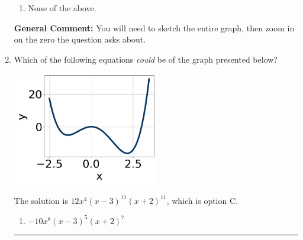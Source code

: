 \documentclass{extbook}[14pt]
\newcommand{\litem}[1]{\item #1

\rule{\textwidth}{0.4pt}}
\begin{document}
\begin{enumerate}
{\begin{enumerate}[label=\Alph*.]
\item None of the above.\end{enumerate}
\textbf{General Comment:} You will need to sketch the entire graph, then zoom in on the zero the question asks about.
}
\litem{
Which of the following equations \textit{could} be of the graph presented below?

\begin{center}
    \includegraphics[width=0.5\textwidth]{../Figures/polyGraphToFunctionCopyA.png}
\end{center}


The solution is \( 12x^{4} (x - 3)^{11} (x + 2)^{11} \), which is option C.\begin{enumerate}[label=\Alph*.]
\item \( -10x^{8} (x - 3)^{5} (x + 2)^{7} \)


\end{enumerate}}
\end{enumerate}
\end{document}
